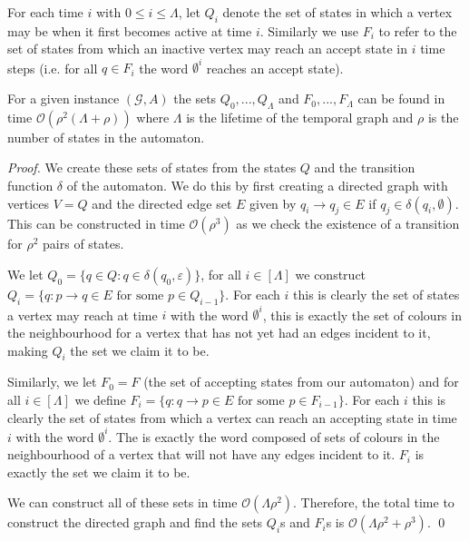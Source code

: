 \documentclass[runningheads]{llncs}
\begin{document}
For each time $i$ with $0 \le i \le \Lambda$, let $Q_i$ denote the set of states in which a vertex may be when it first becomes active at time $i$.
Similarly we use $F_i$ to refer to the set of states from which an inactive vertex may reach an accept state in $i$ time steps (i.e. for all $q \in F_i$ the word $\emptyset^{i}$ reaches an accept state).

\begin{lemmarep}\label{lem:vim sets}
    For a given instance $(\mathcal{G},A)$ the sets $Q_0,...,Q_\Lambda$ and $F_0,...,F_\Lambda$ can be found in time $\mathcal{O}(\rho^2(\Lambda +\rho))$ where $\Lambda$ is the lifetime of the temporal graph and $\rho$ is the number of states in the automaton.
\end{lemmarep}
\begin{proof}
We create these sets of states from the states $Q$ and the transition function $\delta$ of the automaton. We do this by first creating a directed graph with vertices $V=Q$ and the directed edge set $E$ given by $q_i\rightarrow q_j\in E$ if $q_j \in \delta(q_i,\emptyset)$. This can be constructed in time $\mathcal{O}(\rho^3)$ as we check the existence of a transition for $\rho^2$ pairs of states.

We let $Q_0=\{q \in Q:q \in \delta(q_0,\varepsilon)\}$,
for all $i \in [\Lambda]$ we construct $Q_i=\{q:p\rightarrow q \in E \text{ for some } p \in Q_{i-1}\}$. For each $i$ this is clearly the set of states a vertex may reach at time $i$ with the word $\emptyset^i$, this is exactly the set of colours in the neighbourhood for a vertex that has not yet had an edges incident to it, making $Q_i$ the set we claim it to be.

Similarly, we let $F_0=F$ (the set of accepting states from our automaton) and for all $i\in [\Lambda]$ we define $F_i=\{q: q \rightarrow p \in E \text{ for some } p \in F_{i-1}\}$. For each $i$ this is clearly the set of states from which a vertex can reach an accepting state in time $i$ with the word $\emptyset^i$. The is exactly the word composed of sets of colours in the neighbourhood of a vertex that will not have any edges incident to it. $F_i$ is exactly the set we claim it to be.

We can construct all of these sets in time $\mathcal{O}(\Lambda \rho^2)$. Therefore, the total time to construct the directed graph and find the sets $Q_i$s and $F_i$s is $\mathcal{O}(\Lambda\rho^2+\rho^3)$.
\qed \end{proof}
\end{document}
